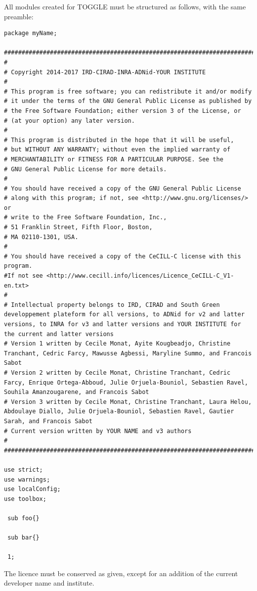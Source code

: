 \documentclass[a4paper,10pt]{report}
\begin{document}
All modules created for TOGGLE must be structured as follows, with the same preamble:

\begin{lstlisting}
package myName;

################################################################################################################################
#
# Copyright 2014-2017 IRD-CIRAD-INRA-ADNid-YOUR INSTITUTE
#
# This program is free software; you can redistribute it and/or modify
# it under the terms of the GNU General Public License as published by
# the Free Software Foundation; either version 3 of the License, or
# (at your option) any later version.
#
# This program is distributed in the hope that it will be useful,
# but WITHOUT ANY WARRANTY; without even the implied warranty of
# MERCHANTABILITY or FITNESS FOR A PARTICULAR PURPOSE. See the
# GNU General Public License for more details.
#
# You should have received a copy of the GNU General Public License
# along with this program; if not, see <http://www.gnu.org/licenses/> or
# write to the Free Software Foundation, Inc.,
# 51 Franklin Street, Fifth Floor, Boston,
# MA 02110-1301, USA.
#
# You should have received a copy of the CeCILL-C license with this program.
#If not see <http://www.cecill.info/licences/Licence_CeCILL-C_V1-en.txt>
#
# Intellectual property belongs to IRD, CIRAD and South Green developpement plateform for all versions, to ADNid for v2 and latter versions, to INRA for v3 and latter versions and YOUR INSTITUTE for the current and latter versions
# Version 1 written by Cecile Monat, Ayite Kougbeadjo, Christine Tranchant, Cedric Farcy, Mawusse Agbessi, Maryline Summo, and Francois Sabot
# Version 2 written by Cecile Monat, Christine Tranchant, Cedric Farcy, Enrique Ortega-Abboud, Julie Orjuela-Bouniol, Sebastien Ravel, Souhila Amanzougarene, and Francois Sabot
# Version 3 written by Cecile Monat, Christine Tranchant, Laura Helou, Abdoulaye Diallo, Julie Orjuela-Bouniol, Sebastien Ravel, Gautier Sarah, and Francois Sabot 
# Current version written by YOUR NAME and v3 authors
#
################################################################################################################################

use strict;
use warnings;
use localConfig;
use toolbox;

 sub foo{}

 sub bar{}
 
 1;
 \end{lstlisting}

The licence must be conserved as given, except for an addition of the current developer name and institute.
\end{document}
